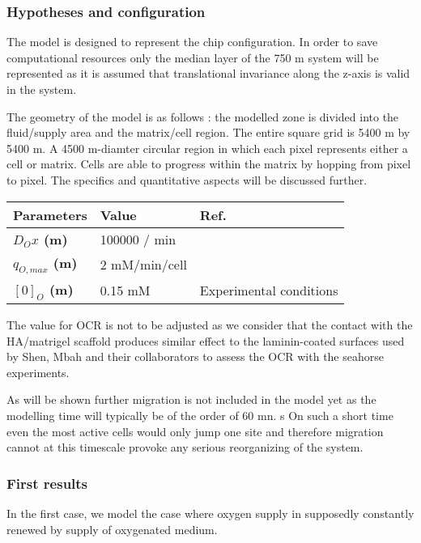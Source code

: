 \documentclass[11pt,a4paper]{article}
\begin{document}
\subsubsection{Hypotheses and configuration}
The model is designed to represent the chip configuration. In order to save computational resources only the median layer of the 750 \textmu m system will be represented as it is assumed that translational invariance along the z-axis is valid in the system.

The geometry of the model is as follows : the modelled zone is divided into the fluid/supply area and the matrix/cell region. The entire square grid is 5400 \textmu m by 5400 \textmu m. A 4500 \textmu m-diamter circular region in which each pixel represents either a cell or matrix. Cells are able to progress within the matrix by hopping from pixel to pixel. The specifics and quantitative aspects will be discussed further. 

\begin{center}
	\begin{tabular}{ |p{22mm}|p{15mm}|p{15mm}| }
		\hline
		\textbf{Parameters} & Value & Ref.  \\ 
		\hline
		\textbf{$D_Ox$ (\textmu m)} & 100000 \textmu / min & \cite{Hober1947} \\
		\textbf{$q_{O,max}$ (\textmu m)} & 2 mM/min/cell & \cite{Ruas2018}\cite{Mbah2022}\cite{Shen2020}\\
				\textbf{$[0]_{O}$ (\textmu m)} & 0.15 mM & Experimental conditions
	\end{tabular}
\end{center}

The value for OCR is not  to be adjusted as we consider that the contact with the HA/matrigel scaffold produces similar effect to the laminin-coated surfaces used by Shen, Mbah and their collaborators to assess the OCR with the seahorse experiments.

As will be shown further migration is not included in the model yet as the modelling time will typically be of the order of 60 mn. s On such a short time even the most active cells would only jump one site and therefore migration cannot at this timescale provoke any serious reorganizing of the system.

\subsubsection{First results}
In the first case, we model the case where oxygen supply in supposedly constantly renewed by supply of oxygenated medium. 
\end{document}
